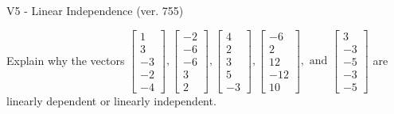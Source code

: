\begin{exercise}
  \begin{exerciseTitle}V5 - Linear Independence (ver. 755)\end{exerciseTitle}
  \begin{exerciseStatement}
    Explain why the vectors \(\left[\begin{array}{r}
1 \\
3 \\
-3 \\
-2 \\
-4
\end{array}\right] , \left[\begin{array}{r}
-2 \\
-6 \\
-6 \\
3 \\
2
\end{array}\right] , \left[\begin{array}{r}
4 \\
2 \\
3 \\
5 \\
-3
\end{array}\right] , \left[\begin{array}{r}
-6 \\
2 \\
12 \\
-12 \\
10
\end{array}\right] , \text{ and } \left[\begin{array}{r}
3 \\
-3 \\
-5 \\
-3 \\
-5
\end{array}\right]\) are linearly dependent or linearly independent.	



\end{exerciseStatement}
\end{exercise}
